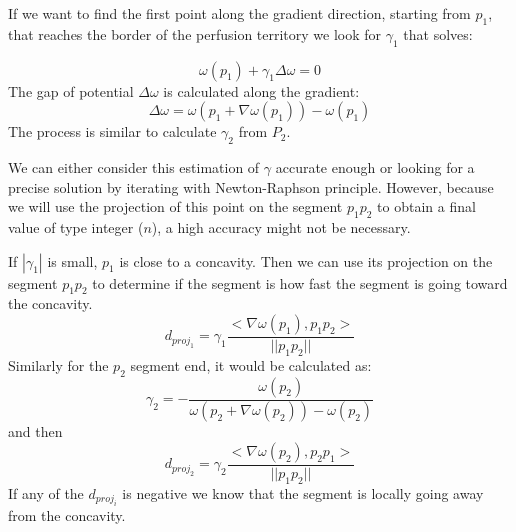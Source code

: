 \documentclass[11pt,a4paper]{article}
\begin{document}

If we want to find the first point along the gradient direction, starting from $p_1$, that reaches the border of the perfusion territory we look for $\gamma_1$ that solves:



\begin{equation}
\omega (p_1) + \gamma_1 \Delta \omega = 0
\end{equation}
The gap of potential $\Delta \omega$ is calculated along the gradient:
\begin{equation}
\Delta \omega  = \omega (p_1 + \nabla \omega (p_1)) - \omega (p_1)
\end{equation}
The process is similar to calculate $\gamma_2$ from $P_2$.

We can either consider this estimation of $\gamma$ accurate enough or looking for a precise solution by iterating with Newton-Raphson principle. However, because we will use the projection of this point on the segment $p_1p_2$ to obtain a final value of type integer ($n$), a high accuracy might not be necessary.


If $|\gamma_1|$ is small, $p_1$ is close to a concavity. 
Then we can use its projection on the segment $p_1p_2$ to determine if the segment is how fast the segment is going toward the concavity.
\begin{equation}
 d_{proj_1} = \gamma_1 \frac{<\nabla \omega(p_1), p_1p_2>}{||p_1p_2||} 
\end{equation}
Similarly for the $p_2$ segment end, it would be calculated  as:
\begin{equation}
\gamma_2 = - \frac{\omega(p_2)}{\omega( p_2 + \nabla \omega(p_2)) -\omega(p_2)} 
\end{equation}
and then
\begin{equation}
 d_{proj_2} = \gamma_2 \frac{<\nabla \omega(p_2), p_2p_1>}{||p_1p_2||}
\end{equation}
If any of the $d_{proj_i}$ is negative we know that the segment is locally going away from the concavity.
\end{document}
